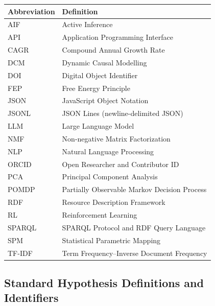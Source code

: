 \documentclass[
]{article}
\newcounter{none} %
\begin{document}
{\def\LTcaptype{none} %
\begin{longtable}[]{@{}ll@{}}
\toprule\noalign{}
Abbreviation & Definition \\
\midrule\noalign{}
\endhead
\bottomrule\noalign{}
\endlastfoot
AIF & Active Inference \\
API & Application Programming Interface \\
CAGR & Compound Annual Growth Rate \\
DCM & Dynamic Causal Modelling \\
DOI & Digital Object Identifier \\
FEP & Free Energy Principle \\
JSON & JavaScript Object Notation \\
JSONL & JSON Lines (newline-delimited JSON) \\
LLM & Large Language Model \\
NMF & Non-negative Matrix Factorization \\
NLP & Natural Language Processing \\
ORCID & Open Researcher and Contributor ID \\
PCA & Principal Component Analysis \\
POMDP & Partially Observable Markov Decision Process \\
RDF & Resource Description Framework \\
RL & Reinforcement Learning \\
SPARQL & SPARQL Protocol and RDF Query Language \\
SPM & Statistical Parametric Mapping \\
TF-IDF & Term Frequency--Inverse Document Frequency \\
\end{longtable}
}

\subsection{Standard Hypothesis Definitions and
Identifiers}\label{standard-hypothesis-definitions-and-identifiers}
\end{document}
